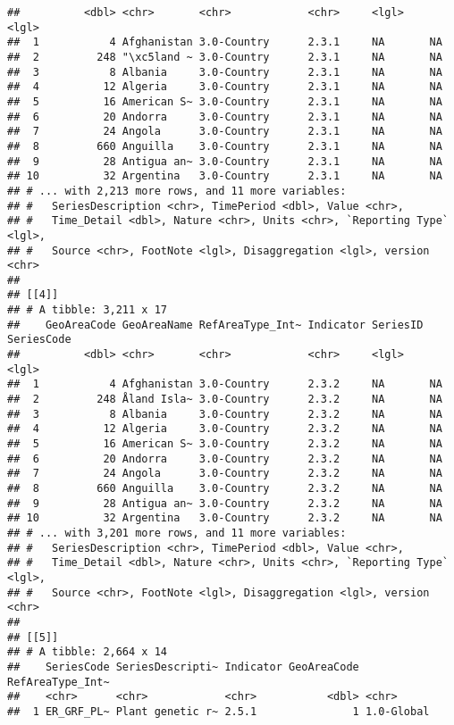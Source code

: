 \documentclass[]{article}
\begin{document}
\begin{verbatim}
##          <dbl> <chr>       <chr>            <chr>     <lgl>    <lgl>     
##  1           4 Afghanistan 3.0-Country      2.3.1     NA       NA        
##  2         248 "\xc5land ~ 3.0-Country      2.3.1     NA       NA        
##  3           8 Albania     3.0-Country      2.3.1     NA       NA        
##  4          12 Algeria     3.0-Country      2.3.1     NA       NA        
##  5          16 American S~ 3.0-Country      2.3.1     NA       NA        
##  6          20 Andorra     3.0-Country      2.3.1     NA       NA        
##  7          24 Angola      3.0-Country      2.3.1     NA       NA        
##  8         660 Anguilla    3.0-Country      2.3.1     NA       NA        
##  9          28 Antigua an~ 3.0-Country      2.3.1     NA       NA        
## 10          32 Argentina   3.0-Country      2.3.1     NA       NA        
## # ... with 2,213 more rows, and 11 more variables:
## #   SeriesDescription <chr>, TimePeriod <dbl>, Value <chr>,
## #   Time_Detail <dbl>, Nature <chr>, Units <chr>, `Reporting Type` <lgl>,
## #   Source <chr>, FootNote <lgl>, Disaggregation <lgl>, version <chr>
## 
## [[4]]
## # A tibble: 3,211 x 17
##    GeoAreaCode GeoAreaName RefAreaType_Int~ Indicator SeriesID SeriesCode
##          <dbl> <chr>       <chr>            <chr>     <lgl>    <lgl>     
##  1           4 Afghanistan 3.0-Country      2.3.2     NA       NA        
##  2         248 Åland Isla~ 3.0-Country      2.3.2     NA       NA        
##  3           8 Albania     3.0-Country      2.3.2     NA       NA        
##  4          12 Algeria     3.0-Country      2.3.2     NA       NA        
##  5          16 American S~ 3.0-Country      2.3.2     NA       NA        
##  6          20 Andorra     3.0-Country      2.3.2     NA       NA        
##  7          24 Angola      3.0-Country      2.3.2     NA       NA        
##  8         660 Anguilla    3.0-Country      2.3.2     NA       NA        
##  9          28 Antigua an~ 3.0-Country      2.3.2     NA       NA        
## 10          32 Argentina   3.0-Country      2.3.2     NA       NA        
## # ... with 3,201 more rows, and 11 more variables:
## #   SeriesDescription <chr>, TimePeriod <dbl>, Value <chr>,
## #   Time_Detail <dbl>, Nature <chr>, Units <chr>, `Reporting Type` <lgl>,
## #   Source <chr>, FootNote <lgl>, Disaggregation <lgl>, version <chr>
## 
## [[5]]
## # A tibble: 2,664 x 14
##    SeriesCode SeriesDescripti~ Indicator GeoAreaCode RefAreaType_Int~
##    <chr>      <chr>            <chr>           <dbl> <chr>           
##  1 ER_GRF_PL~ Plant genetic r~ 2.5.1               1 1.0-Global      

\end{verbatim}
\end{document}
